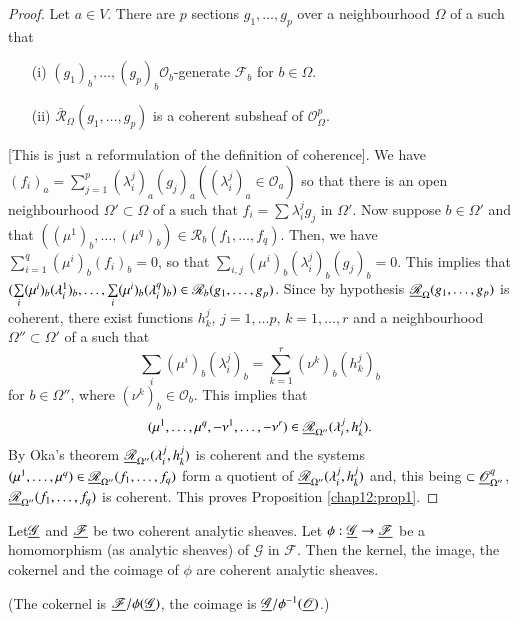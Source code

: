 \begin{proof}
Let $a \in V$. There are $p$ sections $g_1, \ldots, g_p$ over a
neighbourhood $\Omega$ of a such that
\begin{itemize}
\item[(i)] $(g_1)_b, \ldots, (g_p)_b \mathscr{O}_b$-generate
  $\mathscr{F}_b$ for $b \in \Omega$. 

\item[(ii)] $\bar{\mathscr{R}}_\Omega(g_1, \ldots, g_p)$ is a coherent
  subsheaf of $\mathscr{O}^p_\Omega$. 
\end{itemize}
[This is just a reformulation of the definition of coherence]. We have
$(f_i)_a = \sum\limits^p_{j=1} (\lambda^j_i)_a (g_j)_a
((\lambda^j_i)_a \in \mathscr{O}_a)$ so that there is an open
neighbourhood $\Omega' \subset \Omega$ of a such that $f_i = \sum
\lambda^j_i g_j$ in $\Omega'$. Now suppose $b \in \Omega'$ and that
$((\mu^1)_b, \ldots, (\mu^q)_b) \in\mathscr{R}_b (f_1, \ldots,
f_q)$. Then, we have $\sum\limits^q_{i=1} (\mu^i)_b (f_i)_b =0$, so
that $\sum\limits_{i,j} (\mu^i)_b (\lambda^j_i)_b(g_j)_b = 0$. This
implies that $(\sum\limits_i (\mu^i)_b(\lambda^1_i)_b, \ldots,
\sum\limits_i (\mu^i)_b\break (\lambda^q_i)_b) \in\mathscr{R}_b (g_1,
\ldots, g_p)$. Since by hypothesis $\underline{\mathscr{R}}_\Omega(g_1,
\ldots, g_p)$ is coherent, there exist functions $h^j_k$, $j=1, \ldots
p$, $k =1,\ldots, r$ and a neighbourhood $\Omega'' \subset \Omega'$ of
a such that 
$$
\sum\limits_i (\mu^i)_b  (\lambda^j_i)_b = \sum\limits^r_{k=1}
(\nu^k)_b (h^j_k)_b
$$
for $b \in \Omega''$, where $(\nu^k)_b \in \mathscr{O}_b$. This
implies that 
$$
(\mu^1, \ldots, \mu^q, -\nu^1, \ldots, -\nu^r) \in
\underline{\mathscr{R}}_{\Omega''} (\lambda^j_i, h^j_k). 
$$
By Oka's theorem $\underline{\mathscr{R}}_{\Omega''} (\lambda^j_i, h^j_k)$ is
coherent and the systems $(\mu^1, \ldots, \mu^q) \in
\underline{\mathscr{R}}_{\Omega''} (f_1, \ldots, f_q)$ form a quotient of
$\underline{\mathscr{R}}_{\Omega''} (\lambda^j_i, h^j_k)$  and, this being
$\subset \underline{\mathscr{O}}^q_{\Omega''}$, $\underline{\mathscr{R}}_{\Omega''}
(f_1, \ldots, f_q)$ is coherent. This proves Proposition \ref{chap12:prop1}. 
\end{proof}

\setcounter{thm}{0}
\begin{thm}\label{chap12:thm1}
Let\pageoriginale $\underline{\mathscr{G}}$ and $\underline{\mathscr{F}}$ be two coherent
analytic sheaves. Let $\phi:\underline{\mathscr{G}} \to \underline{\mathscr{F}}$ be a
homomorphism (as analytic sheaves) of $\mathscr{G}$ in
$\mathscr{F}$. Then the kernel, the image, the cokernel and the
coimage of $\phi$ are coherent analytic sheaves.

(The cokernel is $\underline{\mathscr{F}}/ \phi (\underline{\mathscr{G}})$, the
coimage is $\underline{\mathscr{G}}/ \phi^{-1} (\underline{\mathscr{O}})$.)
\end{thm}

